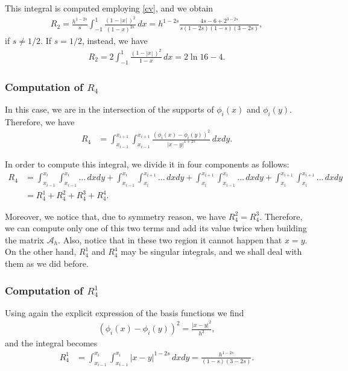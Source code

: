 {This integral is computed employing \eqref{cv}, and we obtain
\begin{align*}
	R_2 = \frac{h^{1-2s}}{s}\int_{-1}^1 \frac{(1-|x|\,)^2}{(1-x)^{2s}}\,dx = h^{1-2s}\frac{4s-6+2^{3-2s}}{s(1-2s)(1-s)(3-2s)}, 
\end{align*}
if $s\neq 1/2$. If $s=1/2$, instead, we have
\begin{align*}
	R_2 = 2\int_{-1}^1 \frac{(1-|x|\,)^2}{1-x}\,dx = 2\ln 16-4.
\end{align*}

\subsubsection*{Computation of $R_4$}
In this case, we are in the intersection of the supports of $\phi_i(x)$ and $\phi_i(y)$. Therefore, we have
\begin{align*}
	R_4 &= \int_{x_{i-1}}^{x_{i+1}}\int_{x_{i-1}}^{x_{i+1}} \frac{(\phi_i(x)-\phi_i(y))^2}{|x-y|^{1+2s}}\,dxdy. 
\end{align*}

In order to compute this integral, we divide it in four components as follows:
\begin{align*}
	R_4 &= \int_{x_{i-1}}^{x_i}\int_{x_{i-1}}^{x_i} \ldots\,dxdy + \int_{x_{i-1}}^{x_i}\int_{x_i}^{x_{i+1}} \ldots\,dxdy +
	\int_{x_i}^{x_{i+1}}\int_{x_{i-1}}^{x_i} \ldots\,dxdy +  \int_{x_i}^{x_{i+1}}\int_{x_i}^{x_{i+1}} \ldots\,dxdy
	\\
	&= R_4^1 + R_4^2 + R_4^3 + R_4^4.
\end{align*}

Moreover, we notice that, due to symmetry reason, we have $R_4^2 = R_4^3$. Therefore, we can compute only one of this two terms and add its value twice when building the matrix $\mathcal A_h$. Also, notice that in these two region it cannot happen that $x=y$. On the other hand, $R_4^1$ and $R_4^4$ may be singular integrals, and we shall deal with them as we did before. 

\subsubsection*{Computation of $R_4^1$}
Using again the explicit expression of the basis functions we find 
\begin{align*}
	(\phi_i(x)-\phi_i(y))^2 = \frac{|x-y|^2}{h^2},
\end{align*}
and the integral becomes
\begin{align*}
	R_4^1 &= \int_{x_{i-1}}^{x_i}\int_{x_{i-1}}^{x_i} |x-y|^{1-2s}\,dxdy = \frac{h^{1-2s}}{(1-s)(3-2s)}. 
\end{align*}

}
